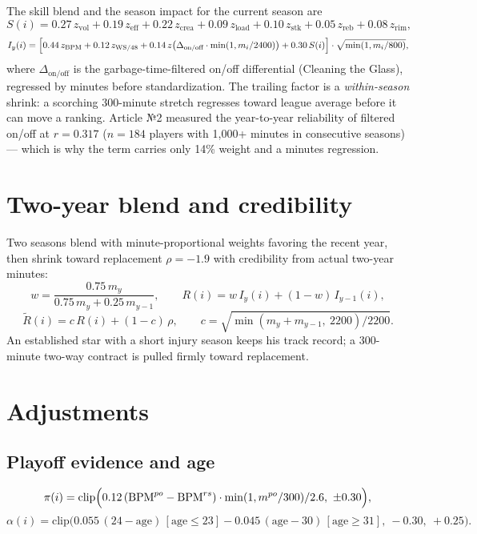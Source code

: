 \documentclass[11pt]{article}
\begin{document}
The skill blend and the season impact for the current season are
\begin{equation}
S(i) = 0.27\, z_{\text{vol}} + 0.19\, z_{\text{eff}} + 0.22\, z_{\text{crea}}
+ 0.09\, z_{\text{load}} + 0.10\, z_{\text{stk}} + 0.05\, z_{\text{reb}} + 0.08\, z_{\text{rim}},
\label{eq:skill}
\end{equation}
\begin{equation}
I_y(i) = \Bigl[0.44\, z_{\mathrm{BPM}} + 0.12\, z_{\mathrm{WS/48}}
+ 0.14\, z\bigl(\Delta_{\text{on/off}}\cdot \min(1, m_i/2400)\bigr)
+ 0.30\, S(i)\Bigr]\cdot \sqrt{\min(1, m_i/800)},
\label{eq:impact}
\end{equation}
where $\Delta_{\text{on/off}}$ is the garbage-time-filtered on/off differential
(Cleaning the Glass), regressed by minutes before standardization. The trailing factor is
a \emph{within-season} shrink: a scorching 300-minute stretch regresses toward league
average before it can move a ranking. Article №2 measured the year-to-year
reliability of filtered on/off at $r = 0.317$ ($n = 184$ players with 1{,}000+ minutes in
consecutive seasons) --- which is why the term carries only 14\% weight and a minutes
regression.

\section{Two-year blend and credibility}

Two seasons blend with minute-proportional weights favoring the recent year, then shrink
toward replacement $\rho = -1.9$ with credibility from actual two-year minutes:
\begin{equation}
w = \frac{0.75\, m_y}{0.75\, m_y + 0.25\, m_{y-1}},
\qquad
R(i) = w\, I_y(i) + (1 - w)\, I_{y-1}(i),
\label{eq:blend}
\end{equation}
\begin{equation}
\tilde{R}(i) = c\,R(i) + (1 - c)\,\rho,
\qquad
c = \sqrt{\min(m_y + m_{y-1},\ 2200)/2200}.
\label{eq:cred}
\end{equation}
An established star with a short injury season keeps his track record; a 300-minute
two-way contract is pulled firmly toward replacement.

\section{Adjustments}

\subsection{Playoff evidence and age}
\begin{equation}
\pi(i) = \mathrm{clip}\Bigl(0.12\,(\mathrm{BPM}^{po} - \mathrm{BPM}^{rs})\cdot
\min(1, m^{po}/300)/2.6,\ \pm 0.30\Bigr),
\label{eq:po}
\end{equation}
\begin{equation}
\alpha(i) = \mathrm{clip}\bigl(0.055\,(24 - \text{age})\,[\text{age} \le 23]
- 0.045\,(\text{age} - 30)\,[\text{age} \ge 31],\ -0.30,\ +0.25\bigr).
\label{eq:age}
\end{equation}
\end{document}
